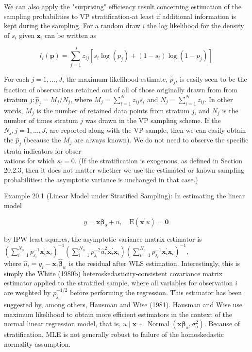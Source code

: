\documentclass[10pt]{article}
\begin{document}
We can also apply the "surprising" efficiency result concerning estimation of the sampling probabilities to VP stratification-at least if additional information is kept during the sampling. For a random draw $i$ the log likelihood for the density of $s_{i}$ given $\mathbf{z}_{i}$ can be written as


\begin{equation*}
l_{i}(\mathbf{p})=\sum_{j=1}^{J} z_{i j}\left[s_{i} \log \left(p_{j}\right)+\left(1-s_{i}\right) \log \left(1-p_{j}\right)\right] \tag{20.9}
\end{equation*}


For each $j=1, \ldots, J$, the maximum likelihood estimate, $\hat{p}_{j}$, is easily seen to be the fraction of observations retained out of all of those originally drawn from from stratum $j: \hat{p}_{j}=M_{j} / N_{j}$, where $M_{j}=\sum_{i=1}^{N} z_{i j} s_{i}$ and $N_{j}=\sum_{i=1}^{N} z_{i j}$. In other words, $M_{j}$ is the number of retained data points from stratum $j$, and $N_{j}$ is the number of times stratum $j$ was drawn in the VP sampling scheme. If the $N_{j}, j=1, \ldots, J$, are reported along with the VP sample, then we can easily obtain the $\hat{p}_{j}$ (because the $M_{j}$ are always known). We do not need to observe the specific strata indicators for obser-\\
vations for which $s_{i}=0$. (If the stratification is exogenous, as defined in Section 20.2.3, then it does not matter whether we use the estimated or known sampling probabilities: the asymptotic variance is unchanged in that case.)

Example 20.1 (Linear Model under Stratified Sampling): In estimating the linear model


\begin{equation*}
y=\mathbf{x} \boldsymbol{\beta}_{\mathrm{o}}+u, \quad \mathrm{E}\left(\mathbf{x}^{\prime} u\right)=\mathbf{0} \tag{20.10}
\end{equation*}


by IPW least squares, the asymptotic variance matrix estimator is\\
$\left(\sum_{i=1}^{N_{0}} p_{j_{i}}^{-1} \mathbf{x}_{i}^{\prime} \mathbf{x}_{i}\right)^{-1}\left(\sum_{i=1}^{N_{0}} p_{j_{i}}^{-2} \hat{u}_{i}^{2} \mathbf{x}_{i}^{\prime} \mathbf{x}_{i}\right)\left(\sum_{i=1}^{N_{0}} p_{j_{i}}^{-1} \mathbf{x}_{i}^{\prime} \mathbf{x}_{i}\right)^{-1}$,\\
where $\hat{u}_{i}=y_{i}-\mathbf{x}_{i} \hat{\boldsymbol{\beta}}_{w}$ is the residual after WLS estimation. Interestingly, this is simply the White (1980b) heteroskedasticity-consistent covariance matrix estimator applied to the stratified sample, where all variables for observation $i$ are weighted by $p_{j_{i}}^{-1 / 2}$ before performing the regression. This estimator has been suggested by, among others, Hausman and Wise (1981). Hausman and Wise use maximum likelihood to obtain more efficient estimators in the context of the normal linear regression model, that is, $u \mid \mathbf{x} \sim \operatorname{Normal}\left(\mathbf{x} \boldsymbol{\beta}_{\mathrm{o}}, \sigma_{\mathrm{o}}^{2}\right)$. Because of stratification, MLE is not generally robust to failure of the homoskedastic normality assumption.
\end{document}
